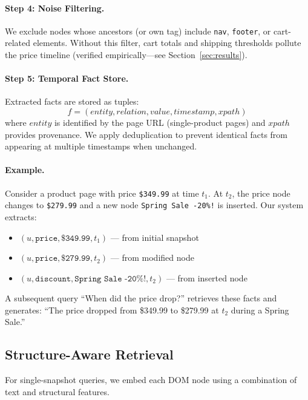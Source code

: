 \documentclass[11pt]{article}
\begin{document}
\paragraph{Step 4: Noise Filtering.} We exclude nodes whose ancestors (or own tag) include \texttt{nav}, \texttt{footer}, or cart-related elements. Without this filter, cart totals and shipping thresholds pollute the price timeline (verified empirically---see Section~\ref{sec:results}).

\paragraph{Step 5: Temporal Fact Store.} Extracted facts are stored as tuples:
\begin{equation}
    f = (entity, relation, value, timestamp, xpath)
\end{equation}
where $entity$ is identified by the page URL (single-product pages) and $xpath$ provides provenance. We apply deduplication to prevent identical facts from appearing at multiple timestamps when unchanged.

\paragraph{Example.} Consider a product page with price \texttt{\$349.99} at time $t_1$. At $t_2$, the price node changes to \texttt{\$279.99} and a new node \texttt{Spring Sale -20\%!} is inserted. Our system extracts:
\begin{itemize}
    \item $(u, \texttt{price}, \texttt{\$349.99}, t_1)$ --- from initial snapshot
    \item $(u, \texttt{price}, \texttt{\$279.99}, t_2)$ --- from modified node
    \item $(u, \texttt{discount}, \texttt{Spring Sale -20\%!}, t_2)$ --- from inserted node
\end{itemize}
A subsequent query ``When did the price drop?'' retrieves these facts and generates: ``The price dropped from \$349.99 to \$279.99 at $t_2$ during a Spring Sale.''

\subsection{Structure-Aware Retrieval}
\label{sec:retrieval}

For single-snapshot queries, we embed each DOM node using a combination of text and structural features.
\end{document}
